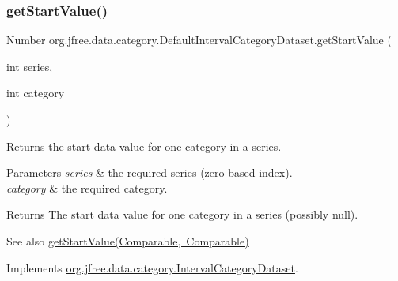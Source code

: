 \mbox{\label{classorg_1_1jfree_1_1data_1_1category_1_1_default_interval_category_dataset_a784e915bf76954a434bf44f587fcb29b}} 
\subsubsection{\texorpdfstring{get\+Start\+Value()}{getStartValue()}\hspace{0.1cm}{\footnotesize\ttfamily [2/2]}}
{\footnotesize\ttfamily Number org.\+jfree.\+data.\+category.\+Default\+Interval\+Category\+Dataset.\+get\+Start\+Value (\begin{DoxyParamCaption}\item[{int}]{series,  }\item[{int}]{category }\end{DoxyParamCaption})}

Returns the start data value for one category in a series.


\begin{DoxyParams}{Parameters}
{\em series} & the required series (zero based index). \\
\hline
{\em category} & the required category.\\
\hline
\end{DoxyParams}
\begin{DoxyReturn}{Returns}
The start data value for one category in a series (possibly {\ttfamily null}).
\end{DoxyReturn}
\begin{DoxySeeAlso}{See also}
\mbox{\hyperlink{classorg_1_1jfree_1_1data_1_1category_1_1_default_interval_category_dataset_a3176b53014d159af5ca98190d4ce27ee}{get\+Start\+Value(\+Comparable, Comparable)}} 
\end{DoxySeeAlso}


Implements \mbox{\hyperlink{interfaceorg_1_1jfree_1_1data_1_1category_1_1_interval_category_dataset_ab39752773cf77a5ccbbae7851fd16aa6}{org.\+jfree.\+data.\+category.\+Interval\+Category\+Dataset}}.

\mbox{\label{classorg_1_1jfree_1_1data_1_1category_1_1_default_interval_category_dataset_a29084222ab5d48db99953fabcd209d03}} 
